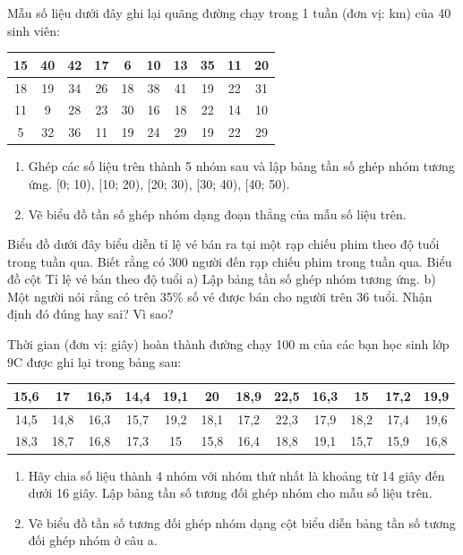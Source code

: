 \documentclass[%
    fontsize=12pt,%
    chapterprefix=false,%
    open=right,%
    twoside=false,%
    numbers=noenddot,%
    headings=optiontohead,%
    final,%
    DIV=15,%
    parskip=half %
]{scrbook}
\begin{document}
\begin{tuluan}
\item Mẫu số liệu dưới đây ghi lại quãng đường chạy trong 1 tuần (đơn vị: km) của 40 sinh viên: \begin{tabular}{|c|c|c|c|c|c|c|c|c|c|} \hline 15 & 40 & 42 & 17 & 6 & 10 & 13 & 35 & 11 & 20 \\ \hline 18 & 19 & 34 & 26 & 18 & 38 & 41 & 19 & 22 & 31 \\ \hline 11 & 9 & 28 & 23 & 30 & 16 & 18 & 22 & 14 & 10 \\ \hline 5 & 32 & 36 & 11 & 19 & 24 & 29 & 19 & 22 & 29 \\ \hline \end{tabular}
\begin{enumerate}[label=\alph*)]
  \item[a)] Ghép các số liệu trên thành 5 nhóm sau và lập bảng tần số ghép nhóm tương ứng. [0; 10), [10; 20), [20; 30), [30; 40), [40; 50).
  \item[b)] Vẽ biểu đồ tần số ghép nhóm dạng đoạn thẳng của mẫu số liệu trên.
\end{enumerate}

\item Biểu đồ dưới đây biểu diễn tỉ lệ vé bán ra tại một rạp chiếu phim theo độ tuổi trong tuần qua. Biết rằng có 300 người đến rạp chiếu phim trong tuần qua. Biểu đồ cột Tỉ lệ vé bán theo độ tuổi a) Lập bảng tần số ghép nhóm tương ứng. b) Một người nói rằng có trên 35\% số vé được bán cho người trên 36 tuổi. Nhận định đó đúng hay sai? Vì sao?

\item Thời gian (đơn vị: giây) hoàn thành đường chạy 100 m của các bạn học sinh lớp 9C được ghi lại trong bảng sau: \begin{tabular}{|c|c|c|c|c|c|c|c|c|c|c|c|} \hline 15,6 & 17 & 16,5 & 14,4 & 19,1 & 20 & 18,9 & 22,5 & 16,3 & 15 & 17,2 & 19,9 \\ \hline 14,5 & 14,8 & 16,3 & 15,7 & 19,2 & 18,1 & 17,2 & 22,3 & 17,9 & 18,2 & 17,4 & 19,6 \\ \hline 18,3 & 18,7 & 16,8 & 17,3 & 15 & 15,8 & 16,4 & 18,8 & 19,1 & 15,7 & 15,9 & 16,8 \\ \hline \end{tabular}
\begin{enumerate}[label=\alph*)]
  \item[a)] Hãy chia số liệu thành 4 nhóm với nhóm thứ nhất là khoảng từ 14 giây đến dưới 16 giây. Lập bảng tần số tương đối ghép nhóm cho mẫu số liệu trên.
  \item[b)] Vẽ biểu đồ tần số tương đối ghép nhóm dạng cột biểu diễn bảng tần số tương đối ghép nhóm ở câu a.
\end{enumerate}


\end{tuluan}
\end{document}
